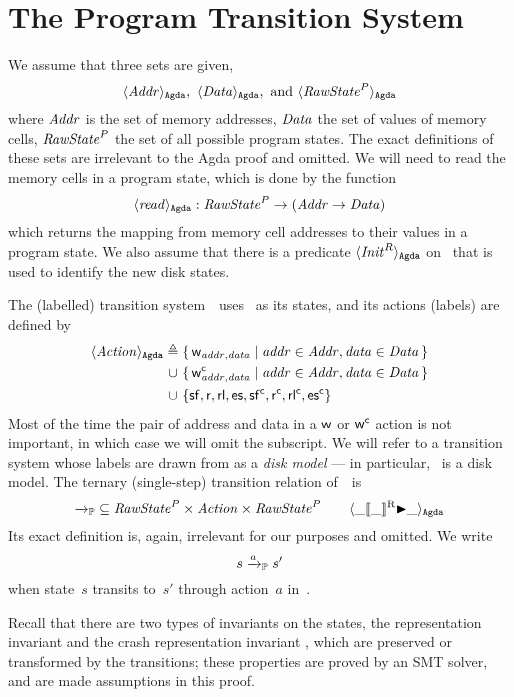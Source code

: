 
\section{The Program Transition System~\Prog}
\label{sec:Prog}

We assume that three sets are given,  
$$ \langle \mathit{Addr} \rangle_\mathtt{Agda},\ \langle \mathit{Data} \rangle_\mathtt{Agda},\ \text{and}\ \langle \mathit{RawState}^P \rangle_\mathtt{Agda} $$
where $\mathit{Addr}$ is the set of memory addresses, $\mathit{Data}$ the set of values of memory cells, $\mathit{RawState}^P$ the set of all possible program states.
The exact definitions of these sets are irrelevant to the Agda proof and omitted.
We will need to read the memory cells in a program state, which is done by the function
$$ \langle \mathit{read} \rangle_\mathtt{Agda} : \mathit{RawState}^P \to (\mathit{Addr} \to \mathit{Data}) $$
which returns the mapping from memory cell addresses to their values in a program state.
We also assume that there is a predicate $\langle \mathit{Init}^R \rangle_\mathtt{Agda}$ on \ProgState\ that is used to identify the new disk states.

The (labelled) transition system~\Prog\ uses \ProgState\ as its states, and its actions (labels) are defined by
\begin{align*}
	\langle \mathit{Action} \rangle_\mathtt{Agda} {}\triangleq{}{} &\{\, \mathsf w_{\mathit{addr}, \mathit{data}} \mid \mathit{addr} \in \mathit{Addr}, \mathit{data} \in \mathit{Data} \,\} \\
	\cup \ &\{\, \mathsf w^\mathsf{c}_{\mathit{addr}, \mathit{data}} \mid \mathit{addr} \in \mathit{Addr}, \mathit{data} \in \mathit{Data} \,\}\\
	\cup \ &\{ \mathsf{sf}, \mathsf r, \mathsf{rl}, \mathsf{es}, \mathsf{sf^c}, \mathsf{r^c}, \mathsf{rl^c}, \mathsf{es^c} \}
\end{align*}
Most of the time the pair of address and data in a $\mathsf w$ or $\mathsf w^\mathsf{c}$ action is not important, in which case we will omit the subscript.
We will refer to a transition system whose labels are drawn from  as a \emph{disk model} --- in particular, \Prog\ is a disk model.
The ternary (single-step) transition relation of~\Prog\ is
$$ {\xrightarrow{}_{\mathbb P}} \subseteq \mathit{RawState}^P \times \mathit{Action} \times \mathit{RawState}^P \qquad \langle \_[\kern-1.5pt[\_]\kern-1.5pt]^{\mathrm R}{\blacktriangleright}\_ \rangle_\mathtt{Agda} $$
Its exact definition is, again, irrelevant for our purposes and omitted.
We write
$$s \xrightarrow{a}_{\mathbb P} s'$$
when state~$s$ transits to~$s'$ through action~$a$ in~\Prog.

Recall that there are two types of invariants on the states, the representation invariant  and the crash representation invariant , which are preserved or transformed by the transitions; these properties are proved by an SMT solver, and are made assumptions in this proof.

